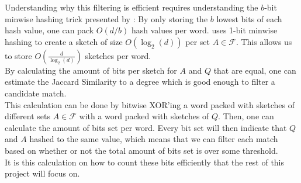 Understanding why this filtering is efficient requires understanding the $b$-bit minwise hashing trick presented by \citet{li2011hashing}:
By only storing the $b$ lowest bits of each hash value, one can pack $O(d/b)$ hash values per word. \citet{fast-similarity-search} uses 1-bit minwise hashing to create a sketch of size $O(\log_2(d))$ per set $A\in \mathcal{F}$. This allows us to store $O(\frac{d}{\log_2(d)})$ sketches per word. \\
By calculating the amount of bits per sketch for $A$ and $Q$ that are equal, one can estimate the Jaccard Similarity to a degree which is good enough to filter a candidate match.\\
This calculation can be done by bitwise XOR'ing a word packed with sketches of different sets $A\in \mathcal{F}$ with a word packed with sketches of $Q$. Then, one can calculate the amount of bits set per word. Every bit set will then indicate that $Q$ and $A$ hashed to the same value, which means that we can filter each match based on whether or not the total amount of bits set is over some threshold.\\
It is this calculation on how to count these bits efficiently that the rest of this project will focus on.
